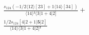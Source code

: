 \documentclass[varwidth, border=5pt]{standalone}
\begin{document}
\begin{my}
$\begin{gathered}
\scriptscriptstyle\frac{s_{124}(-1/2⟨12⟩[23]+1⟨14⟩[34])}{⟨14⟩²⟨3|1+4|2]} +\\
\scriptscriptstyle\frac{1/2s_{124}[4|2+1|𝟓|2]}{⟨14⟩⟨3|1+4|2]²} \phantom{+}
\end{gathered}$
\end{my}
\end{document}
